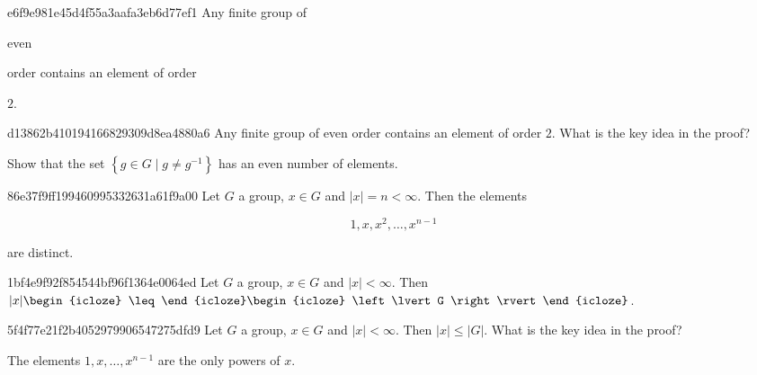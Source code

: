 \begin{note}{e6f9e981e45d4f55a3aafa3eb6d77ef1}
    Any finite group of \begin{icloze}{2}even\end{icloze} order contains an element of order \begin{icloze}{1}\({ 2 }\).\end{icloze}
\end{note}

\begin{note}{d13862b410194166829309d8ea4880a6}
    Any finite group of even order contains an element of order \({ 2 }\).
    What is the key idea in the proof?

    \begin{cloze}{1}
        Show that the set \({ \left\{ g \in G \mid g \neq g^{-1} \right\} }\) has an even number of elements.
    \end{cloze}
\end{note}

\begin{note}{86e37f9ff199460995332631a61f9a00}
    Let \({ G }\) a group, \({ x \in G }\) and \({ \lvert x \rvert = n < \infty }\).
    Then the elements
    \begin{icloze}{2}
        \[
            1, x, x^2, \ldots, x^{n-1}
        \]
    \end{icloze}
    \begin{icloze}{1}are distinct.\end{icloze}
\end{note}

\begin{note}{1bf4e9f92f854544bf96f1364e0064ed}
    Let \({ G }\) a group, \({ x \in G }\) and \({ \lvert x \rvert < \infty }\).
    Then \({ \lvert x \rvert \begin{icloze}{2}\leq\end{icloze} \begin{icloze}{1}\left\lvert G \right\rvert\end{icloze} }\).
\end{note}

\begin{note}{5f4f77e21f2b4052979906547275dfd9}
    Let \({ G }\) a group, \({ x \in G }\) and \({ \lvert x \rvert < \infty }\).
    Then \({ \lvert x \rvert \leq \left\lvert G \right\rvert }\).
    What is the key idea in the proof?

    \begin{cloze}{1}
        The elements \({ 1, x, \ldots, x^{n - 1} }\) are the only powers of \({ x }\).
    \end{cloze}
\end{note}

